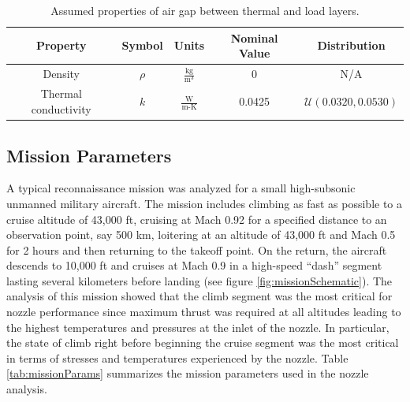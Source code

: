 \documentclass{article}
\begin{document}
\begin{table}
\caption[Air gap material properties]{Assumed properties of air gap between thermal and load layers.}
\label{tab:matPropAirGap}
\begin{center}
\begin{tabular}[]{ c | c | c | c | c }
\textbf{Property} & \textbf{Symbol} & \textbf{Units} & \textbf{Nominal Value} & \textbf{Distribution} \\ \hline
Density & $\rho$ & $\frac{\textrm{kg}}{\textrm{m}^3}$ & 0 & N/A \\ \hline
Thermal conductivity & $k$ & $\frac{\textrm{W}}{\textrm{m-K}}$ & 0.0425 &  $\mathcal{U}(0.0320,0.0530)$ \\ \hline
\end{tabular}
\end{center}
\end{table}

\subsection{Mission Parameters}

A typical reconnaissance mission was analyzed for a small high-subsonic unmanned military aircraft. The mission includes climbing as fast as possible to a cruise altitude of 43,000 ft, cruising at Mach 0.92 for a specified distance to an observation point, say 500 km, loitering at an altitude of 43,000 ft and Mach 0.5 for 2 hours and then returning to the takeoff point. On the return, the aircraft descends to 10,000 ft and cruises at Mach 0.9 in a high-speed ``dash'' segment lasting several kilometers before landing (see figure \ref{fig:missionSchematic}). The analysis of this mission showed that the climb segment was the most critical for nozzle performance since maximum thrust was required at all altitudes leading to the highest temperatures and pressures at the inlet of the nozzle. In particular, the state of climb right before beginning the cruise segment was the most critical in terms of stresses and temperatures experienced by the nozzle. Table \ref{tab:missionParams} summarizes the mission parameters used in the nozzle analysis.
\end{document}
